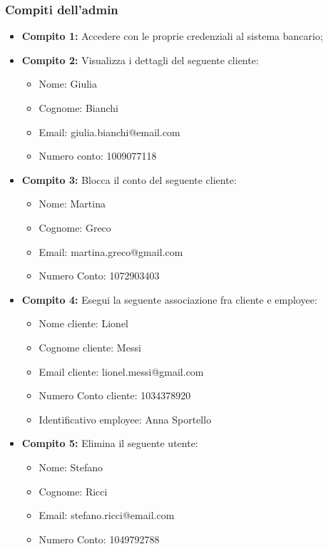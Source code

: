 \subsubsection{Compiti dell'admin}
\begin{itemize}
	\item \textbf{Compito 1:} Accedere con le proprie credenziali al sistema bancario;
	\item \textbf{Compito 2:} Visualizza i dettagli del seguente cliente:
		\begin{itemize}
			\item Nome: Giulia
			\item Cognome: Bianchi
			\item Email: giulia.bianchi@email.com
			\item Numero conto: 1009077118
		\end{itemize}
	\item \textbf{Compito 3:} Blocca il conto del seguente cliente:
		\begin{itemize}
			\item Nome: Martina 
			\item Cognome: Greco
			\item Email: martina.greco@gmail.com
			\item Numero Conto: 1072903403
		\end{itemize}
	\item \textbf{Compito 4:} Esegui la seguente associazione fra cliente e employee:
		\begin{itemize}
			\item Nome cliente: Lionel
			\item Cognome cliente: Messi
			\item Email cliente: lionel.messi@gmail.com
			\item Numero Conto cliente: 1034378920
			\item Identificativo employee: Anna Sportello
		\end{itemize}
	\item \textbf{Compito 5:} Elimina il seguente utente:
		\begin{itemize}
			\item Nome: Stefano 
			\item Cognome: Ricci
			\item Email: stefano.ricci@email.com
			\item Numero Conto: 1049792788
		\end{itemize}
\end{itemize}

